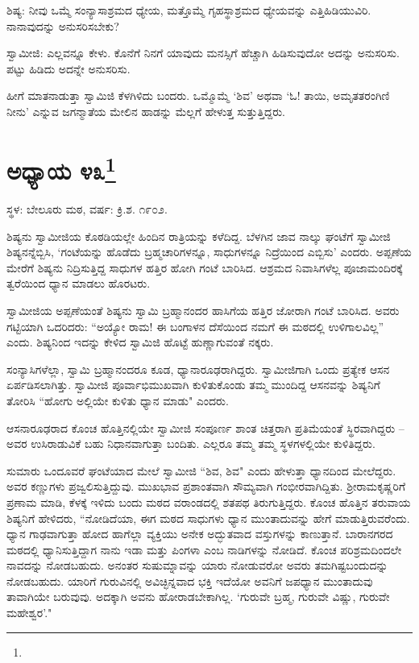ಶಿಷ್ಯ: ನೀವು ಒಮ್ಮೆ ಸಂನ್ಯಾಸಾಶ್ರಮದ ಧ್ಯೇಯ, ಮತ್ತೊಮ್ಮೆ ಗೃಹಸ್ಥಾಶ್ರಮದ ಧ್ಯೇಯವನ್ನು ಎತ್ತಿಹಿಡಿಯುವಿರಿ. ನಾನಾವುದನ್ನು ಅನುಸರಿಸಬೇಕು?

ಸ್ವಾಮೀಜಿ: ಎಲ್ಲವನ್ನೂ ಕೇಳು. ಕೊನೆಗೆ ನಿನಗೆ ಯಾವುದು ಮನಸ್ಸಿಗೆ ಹೆಚ್ಚಾಗಿ ಹಿಡಿಸುವುದೋ ಅದನ್ನು ಅನುಸರಿಸು. ಪಟ್ಟು ಹಿಡಿದು ಅದನ್ನೇ ಅನುಸರಿಸು.

ಹೀಗೆ ಮಾತನಾಡುತ್ತಾ ಸ್ವಾಮಿಜಿ ಕೆಳಗಿಳಿದು ಬಂದರು. ಒಮ್ಮೊಮ್ಮೆ ‘ಶಿವ’ ಅಥವಾ ‘ಓ! ತಾಯಿ, ಅಮೃತತರಂಗಿಣಿ ನೀನು’ ಎನ್ನುವ ಜಗನ್ಮಾತೆಯ ಮೇಲಿನ ಹಾಡನ್ನು ಮೆಲ್ಲಗೆ ಹೇಳುತ್ತ ಸುತ್ತುತ್ತಿದ್ದರು.

\newpage

\chapter[ಅಧ್ಯಾಯ ೪೩]{ಅಧ್ಯಾಯ ೪೩\protect\footnote{}}

\centerline{ಸ್ಥಳ: ಬೇಲೂರು ಮಠ, ವರ್ಷ: ಕ್ರಿ.ಶ. ೧೯೦೨.}

ಶಿಷ್ಯನು ಸ್ವಾಮೀಜಿಯ ಕೊಠಡಿಯಲ್ಲೇ ಹಿಂದಿನ ರಾತ್ರಿಯನ್ನು ಕಳೆದಿದ್ದ. ಬೆಳಗಿನ ಜಾವ ನಾಲ್ಕು ಘಂಟೆಗೆ ಸ್ವಾಮೀಜಿ ಶಿಷ್ಯನನ್ನೆಬ್ಬಿಸಿ, ‘ಗಂಟೆಯನ್ನು ಹೊಡೆದು ಬ್ರಹ್ಮಚಾರಿಗಳನ್ನೂ, ಸಾಧುಗಳನ್ನೂ ನಿದ್ರೆಯಿಂದ ಎಬ್ಬಿಸು’ ಎಂದರು. ಅಪ್ಪಣೆಯ ಮೇರೆಗೆ ಶಿಷ್ಯನು ನಿದ್ರಿಸುತ್ತಿದ್ದ ಸಾಧುಗಳ ಹತ್ತಿರ ಹೋಗಿ ಗಂಟೆ ಬಾರಿಸಿದ. ಆಶ್ರಮದ ನಿವಾಸಿಗಳೆಲ್ಲ ಪೂಜಾಮಂದಿರಕ್ಕೆ ತ್ವರೆಯಿಂದ ಧ್ಯಾನ ಮಾಡಲು ಹೊರಟರು.

ಸ್ವಾಮೀಜಿಯ ಅಪ್ಪಣೆಯಂತೆ ಶಿಷ್ಯನು ಸ್ವಾಮಿ ಬ್ರಹ್ಮಾನಂದರ ಹಾಸಿಗೆಯ ಹತ್ತಿರ ಜೋರಾಗಿ ಗಂಟೆ ಬಾರಿಸಿದ. ಅವರು ಗಟ್ಟಿಯಾಗಿ ಒದರಿದರು: “ಅಯ್ಯೋ ರಾಮ! ಈ ಬಂಗಾಳನ ದೆಸೆಯಿಂದ ನಮಗೆ ಈ ಮಠದಲ್ಲಿ ಉಳಿಗಾಲವಿಲ್ಲ” ಎಂದು. ಶಿಷ್ಯನಿಂದ ಇದನ್ನು ಕೇಳಿದ ಸ್ವಾಮಿಜಿ ಹೊಟ್ಟೆ ಹುಣ್ಣಾಗುವಂತೆ ನಕ್ಕರು.

ಸಂನ್ಯಾಸಿಗಳೆಲ್ಲಾ, ಸ್ವಾಮಿ ಬ್ರಹ್ಮಾನಂದರೂ ಕೂಡ, ಧ್ಯಾನಾರೂಢರಾಗಿದ್ದರು. ಸ್ವಾಮೀಜಿಗಾಗಿ ಒಂದು ಪ್ರತ್ಯೇಕ ಆಸನ ಏರ್ಪಡಿಸಲಾಗಿತ್ತು. ಸ್ವಾಮೀಜಿ ಪೂರ್ವಾಭಿಮುಖವಾಗಿ ಕುಳಿತುಕೊಂಡು ತಮ್ಮ ಮುಂದಿದ್ದ ಆಸನವನ್ನು ಶಿಷ್ಯನಿಗೆ ತೋರಿಸಿ “ಹೋಗು ಅಲ್ಲಿಯೇ ಕುಳಿತು ಧ್ಯಾನ ಮಾಡು" ಎಂದರು.

ಆಸನಾರೂಢರಾದ ಕೊಂಚ ಹೊತ್ತಿನಲ್ಲಿಯೇ ಸ್ವಾಮೀಜಿ ಸಂಪೂರ್ಣ ಶಾಂತ ಚಿತ್ತರಾಗಿ ಪ್ರತಿಮೆಯಂತೆ ಸ್ಥಿರವಾಗಿದ್ದರು – ಅವರ ಉಸಿರಾಡುವಿಕೆ ಬಹು ನಿಧಾನವಾಗುತ್ತಾ ಬಂದಿತು. ಎಲ್ಲರೂ ತಮ್ಮ ತಮ್ಮ ಸ್ಥಳಗಳಲ್ಲಿಯೇ ಕುಳಿತಿದ್ದರು.

ಸುಮಾರು ಒಂದೂವರೆ ಘಂಟೆಯಾದ ಮೇಲೆ ಸ್ವಾಮೀಜಿ “ಶಿವ, ಶಿವ" ಎಂದು ಹೇಳುತ್ತಾ ಧ್ಯಾನದಿಂದ ಮೇಲೆದ್ದರು. ಅವರ ಕಣ್ಣುಗಳು ಪ್ರಜ್ವಲಿಸುತ್ತಿದ್ದುವು. ಮುಖಭಾವ ಪ್ರಶಾಂತವಾಗಿ ಸೌಮ್ಯವಾಗಿ ಗಂಭೀರವಾಗಿದ್ದಿತು. ಶ‍್ರೀರಾಮಕೃಷ್ಣರಿಗೆ ಪ್ರಣಾಮ ಮಾಡಿ, ಕೆಳಕ್ಕೆ ಇಳಿದು ಬಂದು ಮಠದ ವರಾಂಡದಲ್ಲಿ ಶತಪಥ ತಿರುಗುತ್ತಿದ್ದರು. ಕೊಂಚ ಹೊತ್ತಿನ ತರುವಾಯ ಶಿಷ್ಯನಿಗೆ ಹೇಳಿದರು, “ನೋಡಿದೆಯಾ, ಈಗ ಮಠದ ಸಾಧುಗಳು ಧ್ಯಾನ ಮುಂತಾದುವನ್ನು ಹೇಗೆ ಮಾಡುತ್ತಿರುವರೆಂದು. ಧ್ಯಾನ ಗಾಢವಾಗುತ್ತಾ ಹೋದ ಹಾಗೆಲ್ಲಾ ವ್ಯಕ್ತಿಯು ಅನೇಕ ಅದ್ಭುತವಾದ ವಸ್ತುಗಳನ್ನು ಕಾಣುತ್ತಾನೆ. ಬಾರಾನಗರದ ಮಠದಲ್ಲಿ ಧ್ಯಾನಿಸುತ್ತಿದ್ದಾಗ ನಾನು ಇಡಾ ಮತ್ತು ಪಿಂಗಳಾ ಎಂಬ ನಾಡಿಗಳನ್ನು ನೋಡಿದೆ. ಕೊಂಚ ಪರಿಶ್ರಮದಿಂದಲೇ ನಾವದನ್ನು ನೋಡಬಹುದು. ಅನಂತರ ಸುಷುಮ್ನಾವನ್ನು ಯಾರು ನೋಡುವರೋ ಅವರು ತಮಗಿಷ್ಟಬಂದುದನ್ನು ನೋಡಬಹುದು. ಯಾರಿಗೆ ಗುರುವಿನಲ್ಲಿ ಅವಿಚ್ಛಿನ್ನವಾದ ಭಕ್ತಿ ಇದೆಯೋ ಅವನಿಗೆ ಜಪಧ್ಯಾನ ಮುಂತಾದುವು ತಾವಾಗಿಯೇ ಬರುವುವು. ಅದಕ್ಕಾಗಿ ಅವನು ಹೋರಾಡಬೇಕಾಗಿಲ್ಲ. ‘ಗುರುವೇ ಬ್ರಹ್ಮ, ಗುರುವೇ ವಿಷ್ಣು, ಗುರುವೇ ಮಹೇಶ್ವರ’."

